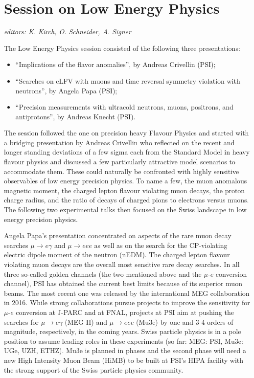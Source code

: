 \section{Session on Low Energy Physics}\label{lowenergy}{\it editors: K. Kirch, O. Schneider, A. Signer}


\noindent The Low Energy Physics session consisted of the following three  presentations:
\begin{itemize} \setlength{\itemsep}{-1ex}
\item ``Implications of the flavor anomalies'', by  Andreas Crivellin (PSI);
\item ``Searches on cLFV with muons and time reversal symmetry violation with
neutrons'', by Angela Papa (PSI);
\item ``Precision measurements with ultracold
neutrons, muons, positrons, and antiprotons'', by Andreas Knecht (PSI).
\end{itemize}

\noindent  The session followed the one on precision heavy Flavour Physics and
started with a bridging presentation by Andreas Crivellin who
reflected on the recent and longer standing deviations of a few sigma
each from the Standard Model in heavy flavour physics and discussed a
few particularly attractive model scenarios to accommodate them. These
could naturally be confronted with highly sensitive observables of low
energy precision physics. To name a few, the muon anomalous magnetic
moment, the charged lepton flavour violating muon decays, the proton
charge radius, and the ratio of decays of charged pions to electrons
versus muons. The following two experimental talks then focused on the
Swiss landscape in low energy precision physics.

\medskip
\noindent Angela Papa's presentation concentrated on aspects of the rare muon
decay searches $\mu\to e \gamma$ and $\mu\to eee$ as well as on the
search for the CP-violating electric dipole moment of the neutron
(nEDM).  The charged lepton flavour violating muon decays are the
overall most sensitive rare decay searches. 
In all three so-called golden channels (the two
mentioned above and the $\mu$-$e$ conversion channel), 
PSI has obtained the current best limits because of its superior muon beams. 
The most recent one was released by the international MEG
collaboration in 2016. While strong collaborations pursue projects to
improve the sensitivity for $\mu$-$e$ conversion at J-PARC and at
FNAL, projects at PSI aim at pushing the searches for $\mu\to e
\gamma$ (MEG-II) and $\mu\to eee$ (Mu3e) by one and 3-4 orders of
magnitude, respectively, in the coming years. Swiss particle physics is
in a pole position to assume leading roles in these experiments (so
far: MEG: PSI, Mu3e: UGe, UZH, ETHZ). Mu3e is planned in phases
and the second phase will need a new High Intensity Muon Beam (HiMB)
to be built at PSI's HIPA facility with the strong support of the Swiss
particle physics community.
\medskip 


